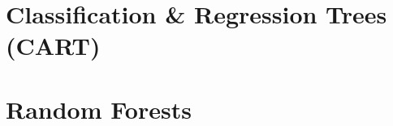 \section{Classification \& Regression Trees (CART)}


\section{Random Forests}

% 
% 
% 
% 

\endlecture


